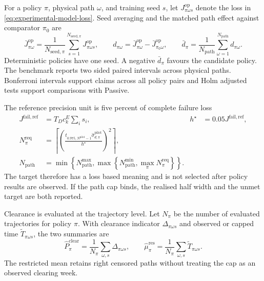 \documentclass[a4paper,fleqn]{cas-sc}
\begin{document}
For a policy $\pi$, physical path $\omega$, and training seed $s$, let
$J^{\mathrm{op}}_{\pi\omega s}$ denote the loss in
\cref{eq:experimental-model-loss}. Seed averaging and the matched path effect
against comparator $\pi_0$ are
\begin{equation}
 \bar J^{\mathrm{op}}_{\pi\omega}
 =\frac{1}{N_{\mathrm{seed},\pi}}
 \sum_{s=1}^{N_{\mathrm{seed},\pi}}J^{\mathrm{op}}_{\pi\omega s},
 \qquad
 d_{\pi\omega}=\bar J^{\mathrm{op}}_{\pi\omega}
 -\bar J^{\mathrm{op}}_{\pi_0\omega},
 \qquad
 \bar d_{\pi}=\frac{1}{N_{\mathrm{path}}}
 \sum_{\omega=1}^{N_{\mathrm{path}}}d_{\pi\omega}.
 \label{eq:benchmark-paired-effect}
\end{equation}
Deterministic policies have one seed. A negative $\bar d_{\pi}$ favours the
candidate policy. The benchmark reports two sided paired intervals across
physical paths. Bonferroni intervals support claims across all policy pairs and
Holm adjusted tests support comparisons with Passive.

The reference precision unit is five percent of complete failure loss
\begin{equation}
\begin{aligned}
 J^{\mathrm{fail,ref}}&=T_Dc^E_k\sum_i s_i,
 & h^\star&=0.05J^{\mathrm{fail,ref}},\\
 N^{\mathrm{req}}_{\pi}
 &=\left\lceil
 \left(\frac{t_{0.975,N^{\mathrm{pilot}}-1}
 \widehat\sigma^{\mathrm{pilot}}_{d,\pi}}{h^\star}\right)^2
 \right\rceil,\\
 N_{\mathrm{path}}
 &=\min\!\left\{N^{\max}_{\mathrm{path}},
 \max\!\left\{N^{\min}_{\mathrm{path}},
 \max_{\pi}N^{\mathrm{req}}_{\pi}\right\}\right\}.
\end{aligned}
 \label{eq:benchmark-path-precision}
\end{equation}
The target therefore has a loss based meaning and is not selected after policy
results are observed. If the path cap binds, the realised half width and the
unmet target are both reported.

Clearance is evaluated at the trajectory level. Let $N_{\pi}$ be the number of
evaluated trajectories for policy $\pi$. With clearance indicator
$\Delta_{\pi\omega s}$ and observed or capped time
$\widetilde T_{\pi\omega s}$, the two summaries are
\begin{equation}
 \widehat P^{\mathrm{clear}}_{\pi}
 =\frac{1}{N_{\pi}}\sum_{\omega,s}\Delta_{\pi\omega s},
 \qquad
 \widehat\mu^{\mathrm{res}}_{\pi}
 =\frac{1}{N_{\pi}}\sum_{\omega,s}\widetilde T_{\pi\omega s}.
 \label{eq:benchmark-clearance-metrics}
\end{equation}
The restricted mean retains right censored paths without treating the cap as an
observed clearing week.
\end{document}
